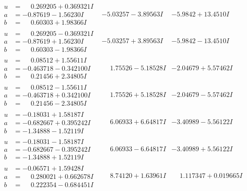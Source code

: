 \documentclass[1p]{elsarticle_modified}
\theoremstyle{definition}
\begin{document}
$$\begin{array}{c|c|c}
\begin{aligned}
u &= \phantom{-}0.269205 + 0.369321 I \\
a &= -0.87619 - 1.56230 I \\
b &= \phantom{-}0.60303 + 1.98366 I\end{aligned}
 & -5.03257 - 3.89563 I & -5.9842 + 13.4510 I \\ \hline\begin{aligned}
u &= \phantom{-}0.269205 - 0.369321 I \\
a &= -0.87619 + 1.56230 I \\
b &= \phantom{-}0.60303 - 1.98366 I\end{aligned}
 & -5.03257 + 3.89563 I & -5.9842 - 13.4510 I \\ \hline\begin{aligned}
u &= \phantom{-}0.08512 + 1.55611 I \\
a &= -0.463718 - 0.342100 I \\
b &= \phantom{-}0.21456 + 2.34805 I\end{aligned}
 & \phantom{-}1.75526 - 5.18528 I & -2.04679 + 5.57462 I \\ \hline\begin{aligned}
u &= \phantom{-}0.08512 - 1.55611 I \\
a &= -0.463718 + 0.342100 I \\
b &= \phantom{-}0.21456 - 2.34805 I\end{aligned}
 & \phantom{-}1.75526 + 5.18528 I & -2.04679 - 5.57462 I \\ \hline\begin{aligned}
u &= -0.18031 + 1.58187 I \\
a &= -0.682667 + 0.395242 I \\
b &= -1.34888 - 1.52119 I\end{aligned}
 & \phantom{-}6.06933 + 6.64817 I & -3.40989 - 5.56122 I \\ \hline\begin{aligned}
u &= -0.18031 - 1.58187 I \\
a &= -0.682667 - 0.395242 I \\
b &= -1.34888 + 1.52119 I\end{aligned}
 & \phantom{-}6.06933 - 6.64817 I & -3.40989 + 5.56122 I \\ \hline\begin{aligned}
u &= -0.06571 + 1.59428 I \\
a &= \phantom{-}0.280021 + 0.662678 I \\
b &= \phantom{-}0.222354 - 0.684451 I\end{aligned}
 & \phantom{-}8.74120 + 1.63961 I & \phantom{-}1.117347 + 0.019665 I \\ \hline\begin{aligned}

\end{aligned}
\end{array}$$
\end{document}
